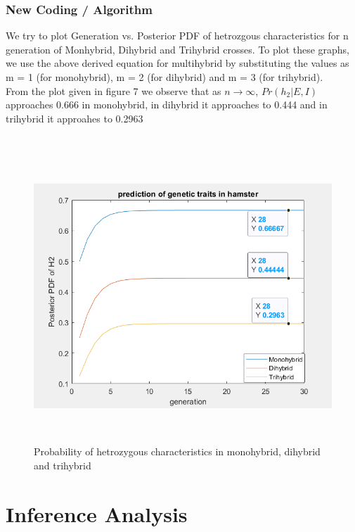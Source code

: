 \documentclass{article}
\begin{document}
\subsubsection{New Coding / Algorithm}
We try to plot Generation vs. Posterior PDF of hetrozgous characteristics for n generation of Monhybrid, Dihybrid and Trihybrid crosses. To plot these graphs, we use the above derived equation for multihybrid by substituting the values as m = 1 (for monohybrid), m = 2 (for dihybrid) and m = 3 (for trihybrid).\\ From the plot given in figure 7 we observe that as $ n \rightarrow \infty $, $ Pr(h_2|E,I) $ approaches 0.666 in monohybrid, in dihybrid it approaches to 0.444 and in trihybrid it approahes to 0.2963 \\\\
\begin{figure}[h]
	\centering
	\includegraphics[height=11cm,width=13cm]{code2}
	\caption{Probability of hetrozygous characteristics in monohybrid, dihybrid and trihybrid}
\end{figure}

\section{Inference Analysis}
	
\end{document}
